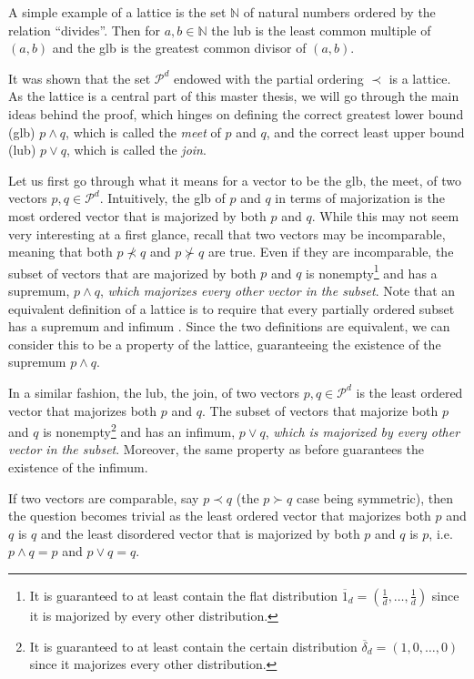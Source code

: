 A simple example of a lattice is the set $\mathbb{N}$ of natural numbers ordered by the relation “divides”. Then for $a, b \in \mathbb{N}$ the lub is the least common multiple of $(a, b)$ and the glb is the greatest common divisor of $(a, b)$. %

It was shown that the set $\mathcal{P}^d$ endowed with the partial ordering $\prec$ is a lattice. As the lattice is a central part of this master thesis, we will go through the main ideas behind the proof, which hinges on defining the correct greatest lower bound (glb) $p \wedge q$, which is called the \textit{meet} of $p$ and $q$, and the correct least upper bound (lub) $p \vee q$, which is called the \textit{join}.

Let us first go through what it means for a vector to be the glb, the meet, of two vectors $p, q \in \mathcal{P}^d$. Intuitively, the glb of $p$ and $q$ in terms of majorization is the most ordered vector that is majorized by both $p$ and $q$. While this may not seem very interesting at a first glance, recall that two vectors may be incomparable, meaning that both $p \nprec q$ and $p \nsucc q$ are true. Even if they are incomparable, the subset of vectors that are majorized by both $p$ and $q$ is nonempty\footnote{It is guaranteed to at least contain the flat distribution $\overline{1}_d = (\frac{1}{d}, \dots, \frac{1}{d})$ since it is majorized by every other distribution.} and has a supremum, $p \wedge q$, \textit{which majorizes every other vector in the subset}. Note that an equivalent definition of a lattice is to require that every partially ordered subset has a supremum and infimum \cite[p. 34]{davey_introduction_2002}. Since the two definitions are equivalent, we can consider this to be a property of the lattice, guaranteeing the existence of the supremum $p \wedge q$.

In a similar fashion, the lub, the join, of two vectors $p, q \in \mathcal{P}^d$ is the least ordered vector that majorizes both $p$ and $q$. The subset of vectors that majorize both $p$ and $q$ is nonempty\footnote{It is guaranteed to at least contain the certain distribution $\overline{\delta}_d = (1, 0, \dots, 0)$ since it majorizes every other distribution.} and has an infimum, $p \vee q$, \textit{which is majorized by every other vector in the subset}. Moreover, the same property as before guarantees the existence of the infimum.

\begin{corollary} \label{cor:comp_meet_join}
    If two vectors are comparable, say $p \prec q$ (the $p \succ q$ case being symmetric), then the question becomes trivial as the least ordered vector that majorizes both $p$ and $q$ is $q$ and the least disordered vector that is majorized by both $p$ and $q$ is $p$, i.e. $p \wedge q = p$ and $p \vee q = q$.
\end{corollary}



